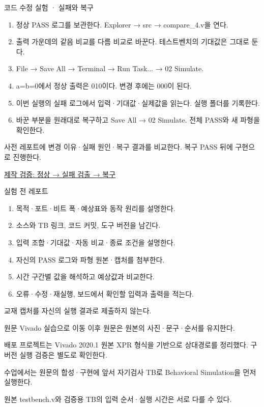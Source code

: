 \begin{frame}{코드 수정 실험 · 실패와 복구}\relax
\small
\begin{enumerate}\setlength{\itemsep}{0.22cm}
\item 정상 PASS 로그를 보관한다. Explorer → src → compare\_4.v을 연다.
\item 출력 가운데의 같음 비교를 다름 비교로 바꾼다. 테스트벤치의 기대값은 그대로 둔다.
\item File → Save All → Terminal → Run Task... → 02 Simulate.
\item a=b=0에서 정상 출력은 010이다. 변경 후에는 000이 된다.
\item 이번 실행의 실패 로그에서 입력·기대값·실제값을 읽는다. 실행 폴더를 기록한다.
\item 바꾼 부분을 원래대로 복구하고 Save All → 02 Simulate. 전체 PASS와 새 파형을 확인한다.
\end{enumerate}
사전 레포트에 변경 이유·실패 원인·복구 결과를 비교한다. 복구 PASS 뒤에 구현으로 진행한다.\par\href{https://github.com/Glaysia/ece2_26_2_2/blob/daily/0910/example/fpga_projects_hdl/LAB1/docs/student-modification-validation.json}{제작 검증: 정상 → 실패 검출 → 복구}
\end{frame}

\begin{frame}{실험 전 레포트}\relax
\small
\begin{enumerate}\setlength{\itemsep}{0.22cm}
\item 목적·포트·비트 폭·예상표와 동작 원리를 설명한다.
\item 소스와 TB 링크, 코드 커밋, 도구 버전을 남긴다.
\item 입력 조합·기대값·자동 비교·종료 조건을 설명한다.
\item 자신의 PASS 로그와 파형 원본·캡처를 첨부한다.
\item 시간 구간별 값을 해석하고 예상값과 비교한다.
\item 오류·수정·재실행, 보드에서 확인할 입력과 출력을 적는다.
\end{enumerate}
교재 캡처를 자신의 실행 결과로 제출하지 않는다.\par
\end{frame}

\begin{frame}[label=legacy-05-vivado]{원문 Vivado 실습으로 이동}\relax
\small
이후 원문은 원본의 사진·문구·순서를 유지한다.\par\vspace{0.22cm}배포 프로젝트는 Vivado 2020.1 원본 XPR 형식을 기반으로 상대경로를 정리했다. 구버전 실행 검증은 별도로 확인한다.\par\vspace{0.22cm}수업에서는 원문의 합성·구현에 앞서 자기검사 TB로 Behavioral Simulation을 먼저 실행한다.\par\vspace{0.22cm}원본 testbench.v와 검증용 TB의 입력 순서·실행 시간은 서로 다를 수 있다.\par
\end{frame}

